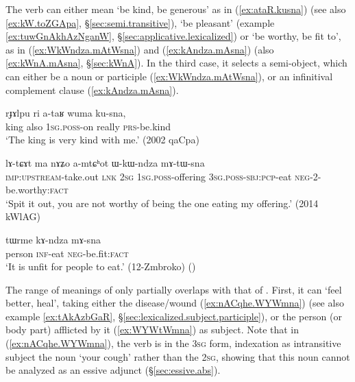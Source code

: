 The verb  can either mean `be kind, be generous' as in (\ref{ex:ataR.kusna}) (see also \ref{ex:kW.toZGApa}, §\ref{sec:semi.transitive}), `be pleasant' (example \ref{ex:tuwGnAkhAzNganW}, §\ref{sec:applicative.lexicalized}) or `be worthy, be fit to', as in (\ref{ex:WkWndza.mAtWsna}) and (\ref{ex:kAndza.mAsna}) (also \ref{ex:kWnA.mAsna}, §\ref{sec:kWnA}). In the third case, it selects a semi-object, which can either be a noun or participle (\ref{ex:WkWndza.mAtWsna}), or an infinitival complement clause (\ref{ex:kAndza.mAsna}).

\begin{exe}
\ex \label{ex:ataR.kusna}
\gll rɟɤlpu ri a-taʁ wuma ku-sna, \\
king also \textsc{1sg}.\textsc{poss}-on really \textsc{prs}-be.kind \\
\glt `The king is very kind with me.' (2002 qaCpa)
\end{exe}

\begin{exe}
\ex \label{ex:WkWndza.mAtWsna}
\gll lɤ-tɕɤt ma nɤʑo a-mtɕʰot ɯ-kɯ-ndza mɤ-tɯ-sna \\
\textsc{imp}:\textsc{upstream}-take.out \textsc{lnk} \textsc{2sg} \textsc{1sg}.\textsc{poss}-offering \textsc{3sg}.\textsc{poss}-\textsc{sbj}:\textsc{pcp}-eat \textsc{neg}-2-be.worthy:\textsc{fact} \\
\glt `Spit it out, you are not worthy of being the one eating my offering.' (2014 kWlAG)
\end{exe}

\begin{exe}
\ex \label{ex:kAndza.mAsna}
\gll tɯrme kɤ-ndza mɤ-sna\\
person \textsc{inf}-eat \textsc{neg}-be.fit:\textsc{fact} \\
\glt `It is unfit for people to eat.' (12-Zmbroko) ()
\end{exe}

The range of meanings of  only partially overlaps with that of . First, it can `feel better, heal', taking either the disease/wound (\ref{ex:nACqhe.WYWmna}) (see also example \ref{ex:tAkAzbGaR}, §\ref{sec:lexicalized.subject.participle}), or the person (or body part) afflicted by it (\ref{ex:WYWtWmna}) as subject. Note that in (\ref{ex:nACqhe.WYWmna}), the verb is in the \textsc{3sg} form, indexation as intransitive subject the noun  `your cough' rather than the \textsc{2sg}, showing that this noun cannot be analyzed as an essive adjunct (§\ref{sec:essive.abs}).

